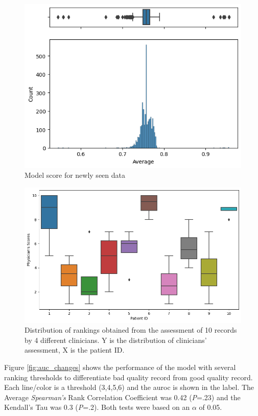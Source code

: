 \begin{figure}[htbp]
\centering
\caption{Model score for newly seen data}\label{fig:scores} 
\includegraphics[scale=0.78]{figures/Scoring_V2.png}
\end{figure}

\begin{figure}[htbp]
\centering
\caption{Distribution of rankings obtained from the assessment of 10 records by 4 different clinicians. Y is the distribution of clinicians' assessment, X is the patient ID.}\label{fig:clinical-dq} 
\includegraphics[scale=0.52]{figures/clinical_assessment_no_model.png}
\end{figure}

Figure \ref{fig:auc_changes} shows the performance of the model with several ranking thresholds to differentiate bad quality record from good quality record. Each line/color is a threshold (3,4,5,6) and the \ac{auroc} is shown in the label. The Average \textit{Spearman's} Rank Correlation Coefficient was 0.42 (\textit{P}=.23) and the Kendall's Tau was 0.3 (\textit{P}=.2). Both tests were based on an $\alpha$ of 0.05.

